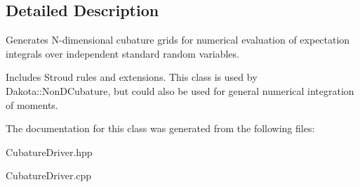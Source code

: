 \subsection{Detailed Description}
Generates N-\/dimensional cubature grids for numerical evaluation of expectation integrals over independent standard random variables. 

Includes Stroud rules and extensions. This class is used by Dakota\+::\+Non\+D\+Cubature, but could also be used for general numerical integration of moments. 

The documentation for this class was generated from the following files\+:\begin{DoxyCompactItemize}
\item 
Cubature\+Driver.\+hpp\item 
Cubature\+Driver.\+cpp\end{DoxyCompactItemize}
